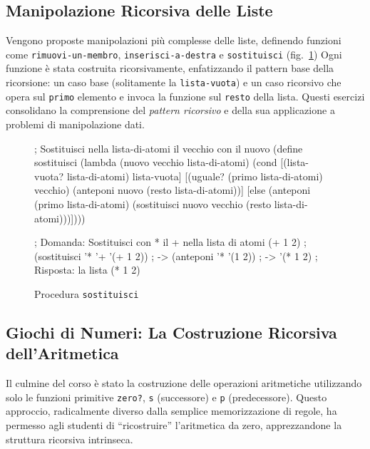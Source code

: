 \documentclass[withtimes]{easychair}
\begin{document}
\subsection{Manipolazione Ricorsiva delle Liste}\label{manipolazione-ricorsiva-delle-liste}

Vengono proposte manipolazioni più complesse delle liste, definendo funzioni come \texttt{rimuovi-un-membro}, \texttt{inserisci-a-destra} e \texttt{sostituisci} (fig.~\ref{fig:sostituisci})
Ogni funzione è stata costruita ricorsivamente, enfatizzando il pattern base della ricorsione: un caso base (solitamente la \texttt{lista-vuota}) e un caso ricorsivo che opera
sul \texttt{primo} elemento e invoca la funzione sul \texttt{resto} della lista. Questi esercizi consolidano la comprensione del \emph{pattern ricorsivo} e della sua applicazione a problemi di manipolazione dati.

\begin{figure}[ht]
  \centering
  \begin{pygmented}[lang=scheme]
; Sostituisci nella lista-di-atomi il vecchio con il nuovo
(define sostituisci
  (lambda (nuovo vecchio lista-di-atomi)
    (cond
     [(lista-vuota? lista-di-atomi) lista-vuota]
     [(uguale? (primo lista-di-atomi) vecchio)
            (anteponi nuovo (resto lista-di-atomi))]
     [else (anteponi
                (primo lista-di-atomi)
                (sostituisci nuovo vecchio (resto lista-di-atomi)))])))

; Domanda: Sostituisci con * il + nella lista di atomi (+ 1 2)
; (sostituisci '* '+ '(+ 1 2))
; -> (anteponi '* '(1 2))
; -> '(* 1 2)
; Risposta: la lista (* 1 2)
  \end{pygmented}
  \caption{Procedura \texttt{sostituisci}}
  \label{fig:sostituisci}
\end{figure}


\subsection{Giochi di Numeri: La Costruzione Ricorsiva dell'Aritmetica}\label{giochi-di-numeri-la-costruzione-ricorsiva-dellaritmetica}

Il culmine del corso è stato la costruzione delle operazioni aritmetiche utilizzando solo le funzioni primitive \texttt{zero?}, \texttt{s} (successore) e \texttt{p} (predecessore). Questo approccio, radicalmente diverso dalla semplice memorizzazione di regole, ha permesso agli studenti di ``ricostruire'' l'aritmetica da zero, apprezzandone la struttura ricorsiva intrinseca.
\end{document}
